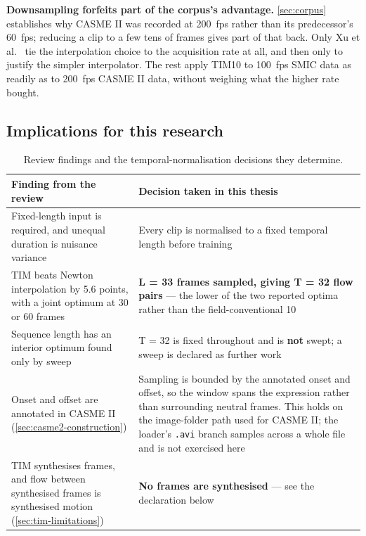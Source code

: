 \textbf{Downsampling forfeits part of the corpus's advantage.} \autoref{sec:corpus} establishes why CASME II was recorded at 200~fps rather than its predecessor's 60~fps; reducing a clip to a few tens of frames gives part of that back. Only Xu et al.~\cite{xu2017} tie the interpolation choice to the acquisition rate at all, and then only to justify the simpler interpolator. The rest apply TIM10 to 100~fps SMIC data as readily as to 200~fps CASME II data, without weighing what the higher rate bought.

\subsection{Implications for this research}
\label{sec:tim-implications}

\begin{table}[htbp]
	\centering
	\footnotesize
	\begin{tabular}{@{}p{5.6cm} p{8.0cm}@{}}
		\hline
		\textbf{Finding from the review} & \textbf{Decision taken in this thesis} \\
		\hline
		Fixed-length input is required, and unequal duration is nuisance variance~\cite{lu2015} & Every clip is normalised to a fixed temporal length before training \\
		TIM beats Newton interpolation by 5.6 points, with a joint optimum at 30 or 60 frames~\cite{ben2021} & \textbf{L = 33 frames sampled, giving T = 32 flow pairs} --- the lower of the two reported optima rather than the field-conventional 10 \\
		Sequence length has an interior optimum found only by sweep~\cite{ben2021} & T = 32 is fixed throughout and is \textbf{not} swept; a sweep is declared as further work \\
		Onset and offset are annotated in CASME II (\autoref{sec:casme2-construction}) & Sampling is bounded by the annotated onset and offset, so the window spans the expression rather than surrounding neutral frames. This holds on the image-folder path used for CASME II; the loader's \texttt{.avi} branch samples across a whole file and is not exercised here \\
		TIM synthesises frames, and flow between synthesised frames is synthesised motion (\autoref{sec:tim-limitations}) & \textbf{No frames are synthesised} --- see the declaration below \\
		\hline
	\end{tabular}
	\caption[Review findings and the temporal-normalisation decisions they determine]{Review findings and the temporal-normalisation decisions they determine.}
	\label{tab:tim-decisions}
\end{table}

